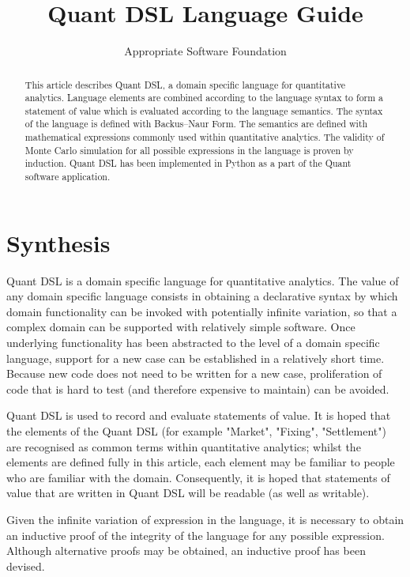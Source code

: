 \documentclass[a4paper,11pt]{article}
\title{Quant DSL Language Guide}
\author{Appropriate Software Foundation}
\begin{document}
\maketitle

\tableofcontents

\begin{abstract}
This article describes Quant DSL, a domain specific language for quantitative analytics. Language elements are combined according to the language syntax to form a statement of value which is evaluated according to the language semantics. The syntax of the language is defined with Backus–Naur Form. The semantics are defined with mathematical expressions commonly used within quantitative analytics. The validity of Monte Carlo simulation for all possible expressions in the language is proven by induction. Quant DSL has been implemented in Python as a part of the Quant software application.
\end{abstract}

\section{Synthesis}

Quant DSL is a domain specific language for quantitative analytics. The value of any domain specific language consists in obtaining a declarative syntax by which domain functionality can be invoked with potentially infinite variation, so that a complex domain can be supported with relatively simple software. Once underlying functionality has been abstracted to the level of a domain specific language, support for a new case can be established in a relatively short time. Because new code does not need to be written for a new case, proliferation of code that is hard to test (and therefore expensive to maintain) can be avoided.

Quant DSL is used to record and evaluate statements of value. It is hoped that the elements of the Quant DSL (for example "Market", "Fixing", "Settlement") are recognised as common terms within quantitative analytics; whilst the elements are defined fully in this article, each element may be familiar to people who are familiar with the domain. Consequently, it is hoped that statements of value that are written in Quant DSL will be readable (as well as writable).

Given the infinite variation of expression in the language, it is necessary to obtain an inductive proof of the integrity of the language for any possible expression. Although alternative proofs may be obtained, an inductive proof has been devised.
\end{document}
